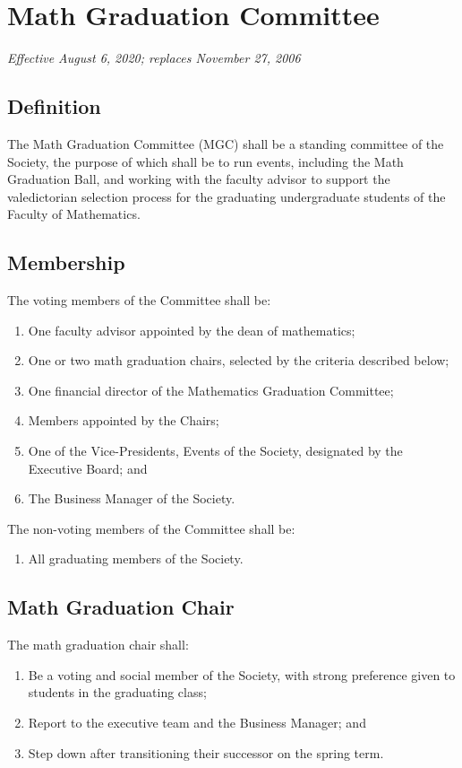 \section{Math Graduation Committee}
\emph{Effective August 6, 2020; replaces November 27, 2006}\\

\subsection{Definition}
The Math Graduation Committee (MGC) shall be a standing committee of the Society, the 
purpose of which shall be to run events, including the Math Graduation Ball, and
working with the faculty advisor to support the valedictorian selection process for
the graduating undergraduate students of the Faculty of Mathematics.

\subsection{Membership}
The voting members of the Committee shall be:
\begin{enumerate}
\item One faculty advisor appointed by the dean of mathematics;
\item One or two math graduation chairs, selected by the criteria described below;
\item One financial director of the Mathematics Graduation Committee;
\item Members appointed by the Chairs;
\item One of the Vice-Presidents, Events of the Society, designated by the Executive Board; and 
\item The Business Manager of the Society.
\end{enumerate}
The non-voting members of the Committee shall be:
\begin{enumerate}
\item All graduating members of the Society.
\end{enumerate}

\subsection{Math Graduation Chair}
The math graduation chair shall:
\begin{enumerate}
\item Be a voting and social member of the Society, with strong preference given to students in the graduating class;
\item Report to the executive team and the Business Manager; and 
\item Step down after transitioning their successor on the spring term.
\end{enumerate}

